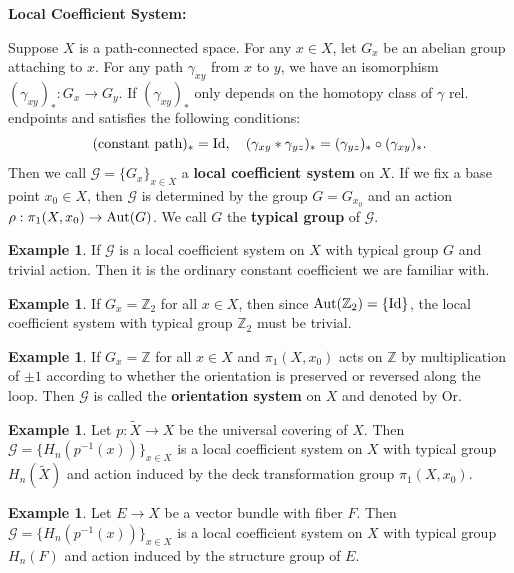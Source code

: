 \documentclass[12pt,a4paper]{article}
\theoremstyle{definition}
\newtheorem{example}[theorem]{\indent Example}
\newcommand{\Id}{{\rm Id}}
\newcommand{\mZ}{\mathbb{Z}}
\newcommand{\Aut}{{\rm Aut}}
\begin{document}
\noindent\textbf{Local Coefficient System:}

Suppose $X$ is a path-connected space. For any $x\in X$, let $G_x$ be an 
abelian group attaching to $x$. For any path $\gamma_{xy}$ from $x$ to $y$, 
we have an isomorphism $(\gamma_{xy})_*:G_x\to G_y$. If $(\gamma_{xy})_*$ 
only depends on the homotopy class of $\gamma$ rel. endpoints and satisfies 
the following conditions: 
\begin{equation*}
    (\text{constant path})_* = \Id, \quad
    (\gamma_{xy}*\gamma_{yz})_* = (\gamma_{yz})_*\circ(\gamma_{xy})_*.
\end{equation*}
Then we call $\mathcal{G} = \{G_x\}_{x\in X}$ a 
\textbf{local coefficient system} on $X$. If we fix a base point $x_0\in X$, 
then $\mathcal{G}$ is determined by the group $G = G_{x_0}$ and an action 
$\rho:\pi_1(X,x_0)\to \Aut(G)$. We call $G$ the \textbf{typical group} of 
$\mathcal{G}$. 

\begin{example}
    If $\mathcal{G}$ is a local coefficient system on $X$ with typical group 
    $G$ and trivial action. Then it is the ordinary constant coefficient we 
    are familiar with.
\end{example}

\begin{example}
    If $G_x = \mZ_2$ for all $x\in X$, then since $\Aut(\mZ_2)=\{\Id\}$, 
    the local coefficient system with typical group $\mZ_2$ must be trivial. 
\end{example}

\begin{example}
    If $G_x = \mZ$ for all $x\in X$ and $\pi_1(X,x_0)$ acts on $\mZ$ by
    multiplication of $\pm 1$ according to whether the orientation is
    preserved or reversed along the loop. Then $\mathcal{G}$ is called the 
    \textbf{orientation system} on $X$ and denoted by $\mathrm{Or}$. 
\end{example}

\begin{example}
    Let $p:\tilde{X}\to X$ be the universal covering of $X$. Then 
    $\mathcal{G} = \{H_n(p^{-1}(x))\}_{x\in X}$ is a local coefficient system 
    on $X$ with typical group $H_n(\tilde{X})$ and action induced by the 
    deck transformation group $\pi_1(X,x_0)$. 
\end{example}

\begin{example}
    Let $E\to X$ be a vector bundle with fiber $F$. Then 
    $\mathcal{G} = \{H_n(p^{-1}(x))\}_{x\in X}$ is a local coefficient system 
    on $X$ with typical group $H_n(F)$ and action induced by the structure 
    group of $E$.
\end{example}
\end{document}
